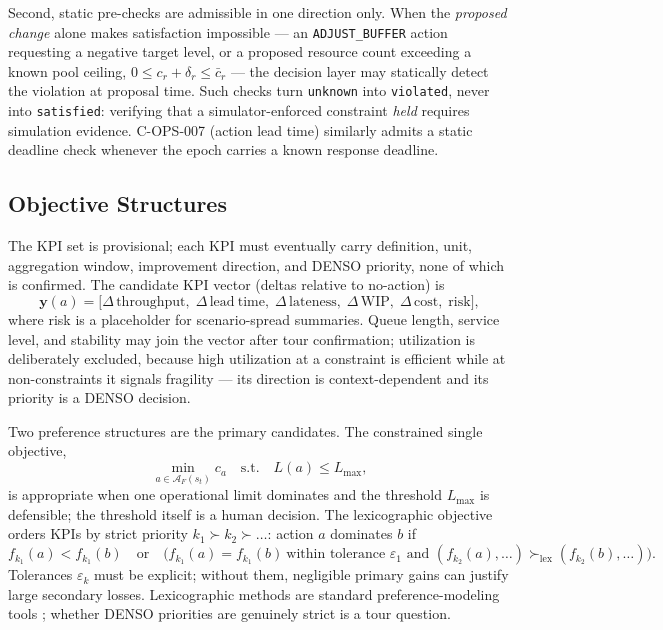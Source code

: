 \documentclass[11pt,a4paper]{article}
\newcommand{\Acal}{\mathcal{A}}
\begin{document}
Second, static pre-checks are admissible in one direction only. When the
\emph{proposed change} alone makes satisfaction impossible --- an
\texttt{ADJUST\_BUFFER} action requesting a negative target level, or a
proposed resource count exceeding a known pool ceiling,
$0 \le c_r + \delta_r \le \bar{c}_r$ --- the decision layer may statically
detect the violation at proposal time. Such checks turn \texttt{unknown} into
\texttt{violated}, never into \texttt{satisfied}: verifying that a
simulator-enforced constraint \emph{held} requires simulation evidence.
C-OPS-007 (action lead time) similarly admits a static deadline check
whenever the epoch carries a known response deadline.

\subsection{Objective Structures}\label{sec:objectives}

The KPI set is provisional; each KPI must eventually carry definition, unit,
aggregation window, improvement direction, and DENSO priority, none of which
is confirmed. The candidate KPI vector (deltas relative to no-action) is
\begin{equation}\label{eq:kpivec}
\mathbf{y}(a)
=
\bigl[
\Delta\,\mathrm{throughput},\;
\Delta\,\mathrm{lead\ time},\;
\Delta\,\mathrm{lateness},\;
\Delta\,\mathrm{WIP},\;
\Delta\,\mathrm{cost},\;
\mathrm{risk}
\bigr],
\end{equation}
where risk is a placeholder for scenario-spread summaries. Queue length,
service level, and stability may join the vector after tour confirmation;
utilization is deliberately excluded, because high utilization at a
constraint is efficient while at non-constraints it signals fragility --- its
direction is context-dependent and its priority is a DENSO decision.

Two preference structures are the primary candidates. The constrained single
objective,
\begin{equation}\label{eq:constrained}
\min_{a \in \Acal_F(s_t)} c_a
\quad\text{s.t.}\quad
L(a) \le L_{\max},
\end{equation}
is appropriate when one operational limit dominates and the threshold
$L_{\max}$ is defensible; the threshold itself is a human decision. The
lexicographic objective orders KPIs by strict priority $k_1 \succ k_2 \succ
\dots$: action $a$ dominates $b$ if
\begin{equation}\label{eq:lex}
f_{k_1}(a) < f_{k_1}(b)
\quad\text{or}\quad
\bigl(f_{k_1}(a) = f_{k_1}(b)\ \text{within tolerance }\varepsilon_1
\text{ and } (f_{k_2}(a),\dots) \succ_{\mathrm{lex}} (f_{k_2}(b),\dots)\bigr).
\end{equation}
Tolerances $\varepsilon_k$ must be explicit; without them, negligible primary
gains can justify large secondary losses. Lexicographic methods are standard
preference-modeling tools \cite{miettinen1998nonlinear}; whether DENSO
priorities are genuinely strict is a tour question.
\end{document}
